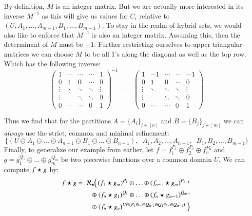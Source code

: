 By definition, $M$ is an integer matrix.
But we are actually more interested in its inverse $M^{-1}$ as this will give us values for $C_i$ 
relative to $( U, A_1, \ldots, A_{m-1}, B_1, \ldots, B_{m-1} )$.
To stay in the realm of hybrid sets, we would also like to enforce that $M^{-1}$ is also an integer matrix.
Assuming this, then the determinant of $M$ must be $\pm 1$.
Further restricting ourselves to upper triangular matrices we can choose $M$ to be all 1's along the diagonal
as well as the top row. 
Which has the following inverse:
\begin{equation}
	\begin{pmatrix}
		1 		&\cdots 	&\cdots 	&\cdots 	& 1 		\\[-0.5em]
		0		& 1		& 0 		&\cdots 	& 0 		\\[-0.5em]
		\vdots 	&\ddots 	&\ddots 	&\ddots 	&\vdots 	\\[-0.5em]
		\vdots 	&		&\ddots 	&\ddots 	& 0 		\\[-0.5em]
		0 		&\cdots 	&\cdots 	& 0 		& 1
	\end{pmatrix}^{-1}
	= \; \; \;
	\begin{pmatrix}
		1 		&-1	 	&\cdots 	&\cdots 	& -1		\\[-0.5em]
		0		& 1		& 0 		&\cdots 	& 0 		\\[-0.5em]
		\vdots 	&\ddots 	&\ddots 	&\ddots 	&\vdots 	\\[-0.5em]
		\vdots 	&		&\ddots 	&\ddots 	& 0 		\\[-0.5em]
		0 		&\cdots 	&\cdots 	& 0 		& 1
	\end{pmatrix}
\end{equation}



Thus we find that for the partitions $A = \{ A_i \}_{i \in [n]}$ and $B = \{ B_j \}_{j \in [m]}$ we can \emph{always}
use the strict, common and minimal refinement:
\begin{equation}
	\Big\{ (U \ominus A_1 \ominus \ldots \ominus A_{n-1} \ominus B_1 \ominus \ldots \ominus B_{n-1}), \;\;
	A_1, A_2, \ldots, A_{n-1}, \;\; B_1, B_2, \ldots, B_{m-1}
	\Big\}
\end{equation}
Finally, to generalize our example from earlier, let $f = f_1^{P_1} \oplus f_2^{P_2} \oplus f_n^{P_n}$
and  $g = g_1^{Q_1} \oplus \ldots \oplus g_m^{Q_m}$ be two piecewise functions over a common domain $U$.
We can compute $f \star g$ by:
\begin{align}
f \star g = \; \mathcal{R}_\star  \; & \!\!\! \left( \,
		(f_1 \star g_m)^{P_1} 
		\oplus \ldots \oplus 
		 (f_{n-1} \star g_m)^{P_{n-1}} \right. \notag \\
	\oplus & \;
		 (f_n \star g_1)^{Q_1} 
		\oplus \ldots \oplus 
		 (f_n \star g_{m-1})^{Q_{m-1}} \notag \\
	\oplus & \left. 
		 (f_n \star g_n)^{U \ominus (P_1 \oplus \ldots \oplus Q_{n-1} \oplus Q_1 \oplus \ldots \oplus Q_{m-1})}
	\; \right)
\end{align}


